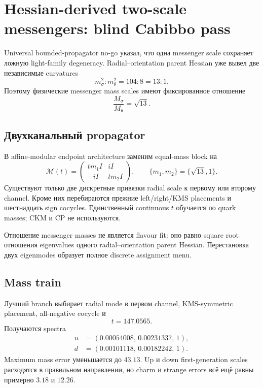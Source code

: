 \chapter{Hessian-derived two-scale messengers: blind Cabibbo pass}

Universal bounded-propagator no-go указал, что одна messenger scale сохраняет
ложную light-family degeneracy. Radial--orientation parent Hessian уже вывел
две независимые curvatures
\begin{equation}
 m_\sigma^2:m_\theta^2=104:8=13:1.
\end{equation}
Поэтому физические messenger mass scales имеют фиксированное отношение
\begin{equation}
 \frac{M_\sigma}{M_\theta}=\sqrt{13}.
\end{equation}

\section{Двухканальный propagator}

В affine-modular endpoint architecture заменим equal-mass block на
\begin{equation}
 \mathcal M(t)=
 \begin{pmatrix}
 t m_1 I&iI\\
 -iI&t m_2 I
 \end{pmatrix},
 \qquad
 \{m_1,m_2\}=\{\sqrt{13},1\}.
\end{equation}
Существуют только две дискретные привязки radial scale к первому или второму
channel. Кроме них перебираются прежние left/right/KMS placements и
шестнадцать sign cocycles. Единственный continuous \(t\) обучается по quark
masses; CKM и CP не используются.

\begin{proposition}
Отношение messenger masses не является flavour fit: оно равно square root
отношения eigenvalues одного radial--orientation parent Hessian. Перестановка
двух eigenmodes образует полное discrete assignment menu.
\end{proposition}

\section{Mass train}

Лучший branch выбирает radial mode в первом channel, KMS-symmetric placement,
all-negative cocycle и
\begin{equation}
 t=147.0565.
\end{equation}
Получаются spectra
\begin{align}
 u&=(0.00054008,\,0.00231337,\,1),\\
 d&=(0.00101118,\,0.00182242,\,1).
\end{align}
Maximum mass error уменьшается до \(43.13\). Up и down first-generation
scales расходятся в правильном направлении, но charm и strange errors всё
ещё равны примерно \(3.18\) и \(12.26\).

